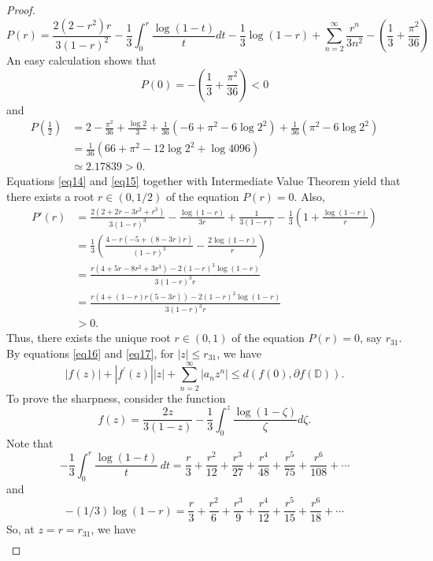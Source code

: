 \documentclass[10pt,a4paper]{amsart}
\begin{document}
\begin{proof}
\begin{equation*}
P(r)=\frac{2 (2-r^2) r}{3 (1-r)^2}-\frac{1}{3} \int_{0}^{r} \frac{\log(1-t)}{t} dt-\frac{1}{3} \log(1-r)+ \sum_{n=2}^{\infty} \frac{r^n}{3 n^2}-\left(\frac{1}{3}+\frac{\pi ^2}{36}\right)
\end{equation*}
An easy calculation shows that
\begin{equation}\label{eq14}
P(0)=-\left(\frac{1}{3}+\frac{\pi ^2}{36}\right)<0
\end{equation}
and
\begin{align}\label{eq15}
P\left(\frac{1}{2}\right)&=2-\frac{\pi ^2}{36}+\frac{\log2}{3}+\frac{1}{36} \left(-6+\pi ^2-6 \log 2^2\right)+\frac{1}{36} \left(\pi ^2-6 \log 2^2\right)\nonumber\\
&=\frac{1}{36} \left(66+\pi ^2-12 \log 2^2+\log4096\right)\nonumber\\
&\simeq2.17839>0.
\end{align}
Equations \eqref{eq14} and \eqref{eq15} together with Intermediate Value Theorem yield that there exists a root $r\in(0, 1/2)$ of the equation $P(r)=0.$
Also,
\begin{align*}
P'(r)&=\frac{2 \left(2+2 r-3 r^2+r^3\right)}{3 (1-r)^3}-\frac{\log(1-r)}{3r}+\frac{1}{3 (1-r)}-\frac{1}{3} \left(1+\frac{\log(1-r)}{r}\right)\\
&=\frac{1}{3} \left(\frac{4-r (-5+(8-3 r) r)}{(1-r)^3}-\frac{2 \log(1-r)}{r}\right)\\
&=\frac{r \left(4+5 r-8 r^2+3 r^3\right)-2 (1-r)^3 \log(1-r)}{3 (1-r)^3 r}\\
&=\frac{r \left(4+(1-r) r (5-3 r)\right)-2 (1-r)^3 \log(1-r)}{3 (1-r)^3 r}\\
&>0.
\end{align*}
Thus, there exists the  unique  root $r\in(0, 1)$ of the equation $P(r)=0$, say $r_{31}$. By equations \eqref{eq16} and \eqref{eq17}, for $|z|\leq r_{31}$, we have
\[|f(z)| + |f^{'}(z)||z| + \sum_{n=2}^{\infty} |a_n z^n| \le d( f(0), \partial{f(\mathbb{D})}).\]
To prove the sharpness, consider the function
\begin{equation*}
    f(z)= \frac{2z}{3(1-z)} - \frac{1}{3} \int_{0}^{z} \frac{\log(1-\zeta)}{\zeta} d\zeta.
\end{equation*}
Note that
\[-\frac{1}{3}\int_0^r \frac{\log(1-t)}{t} \, dt=\frac{r}{3}+\frac{r^2}{12}+\frac{r^3}{27}+\frac{r^4}{48}+\frac{r^5}{75}+\frac{r^6}{108}+\cdots\]
and \[-(1/3) \log(1 - r)=\frac{r}{3}+\frac{r^2}{6}+\frac{r^3}{9}+\frac{r^4}{12}+\frac{r^5}{15}+\frac{r^6}{18}+\cdots\]
So, at  $z=r=r_{31}$, we have
\begin{align*}

\end{align*}
\end{proof}
\end{document}
